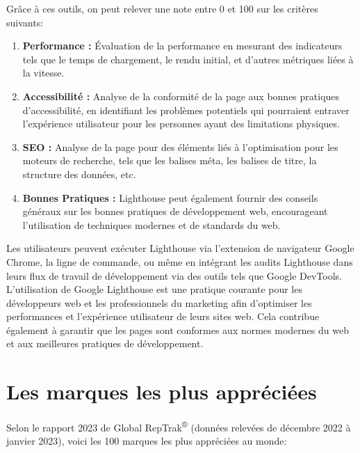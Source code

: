 \documentclass[12pt, a4paper]{report}
\begin{document}
Grâce à ces outils, on peut relever une note entre 0 et 100 sur les critères suivants:
\begin{enumerate}
    \item \textbf{Performance :} Évaluation de la performance en mesurant des indicateurs tels que le temps de chargement, le rendu initial, et d'autres métriques liées à la vitesse.
    
    \item \textbf{Accessibilité :} Analyse de la conformité de la page aux bonnes pratiques d'accessibilité, en identifiant les problèmes potentiels qui pourraient entraver l'expérience utilisateur pour les personnes ayant des limitations physiques.
    
    \item \textbf{SEO :} Analyse de la page pour des éléments liés à l'optimisation pour les moteurs de recherche, tels que les balises méta, les balises de titre, la structure des données, etc.
    
    \item \textbf{Bonnes Pratiques :} Lighthouse peut également fournir des conseils généraux sur les bonnes pratiques de développement web, encourageant l'utilisation de techniques modernes et de standards du web.
\end{enumerate}

Les utilisateurs peuvent exécuter Lighthouse via l'extension de navigateur Google Chrome, la ligne de commande, ou même en intégrant les audits Lighthouse dans leurs flux de travail de développement via des outils tels que Google DevTools.\\

L'utilisation de Google Lighthouse est une pratique courante pour les développeurs web et les professionnels du marketing afin d'optimiser les performances et l'expérience utilisateur de leurs sites web. Cela contribue également à garantir que les pages sont conformes aux normes modernes du web et aux meilleures pratiques de développement.

\newpage
\section{Les marques les plus appréciées}

Selon le rapport 2023 de Global RepTrak\textsuperscript{\tiny{®}} (données relevées de décembre 2022 à janvier 2023), voici les 100 marques les plus appréciées au monde:
\end{document}
